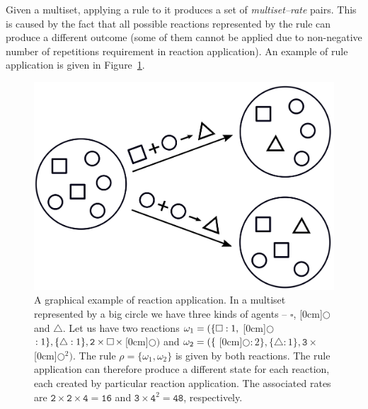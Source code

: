 \documentclass[11pt,a4paper]{report}
\begin{document}
Given a multiset, applying a rule to it produces a set of \emph{multiset--rate} pairs. This is caused by the fact that all possible reactions represented by the rule can produce a different outcome (some of them cannot be applied due to non-negative number of repetitions requirement in reaction application). An example of rule application is given in Figure~\ref{rule_example}.

\begin{figure}[!h]
	\begin{center}
		\includegraphics[scale=0.2]{images/rule.png}
	\end{center}
	\caption{A graphical example of reaction application. In a multiset represented by a big circle we have three kinds of agents -- {\large $\square$}, \raisebox{0.04cm}[0cm]{{$\bigcirc$}} and $\bigtriangleup$. Let us have two reactions $\omega_1 = (\{{\large \square}:1,\hspace{0.1cm} $\raisebox{0.04cm}[0cm]{{$\bigcirc$}}\hspace{0.1cm}$:1\}, \{\bigtriangleup:1\}, \mathtt{2}\times{\large \square}\hspace{0.05cm}\times$\hspace{0.05cm}\raisebox{0.04cm}[0cm]{{$\bigcirc$}}$)$ and $\omega_2 = (\{\hspace{0.1cm} $\raisebox{0.04cm}[0cm]{{$\bigcirc$}}\hspace{0.1cm}$:2\}, \{\bigtriangleup:1\}, \mathtt{3}\times$\hspace{0.05cm}\raisebox{0.04cm}[0cm]{{$\bigcirc$}}$^2)$. The rule $\rho = \{ \omega_1, \omega_2 \}$ is given by both reactions. The rule application can therefore produce a different state for each reaction, each created by particular reaction application. The associated rates are $\mathtt{2} \times \mathtt{2} \times \mathtt{4} = \mathtt{16}$ and $\mathtt{3} \times \mathtt{4}^2 = \mathtt{48}$, respectively.}\label{rule_example}
\end{figure}
\end{document}
